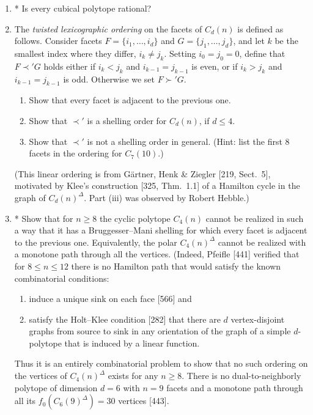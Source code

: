 \documentclass{article}
\begin{document}
\begin{enumerate}
\item* Is every cubical polytope rational?

\item The \emph{twisted lexicographic ordering} on the facets of $C_d(n)$ is defined as follows. Consider facets $F=\{i_1,\dots,i_d\}$ and $G=\{j_1,\dots,j_d\}$, and let $k$ be the smallest index where they differ, $i_k\ne j_k$. Setting $i_0=j_0=0$, define that $F\prec' G$ holds either if $i_k<j_k$ and $i_{k-1}=j_{k-1}$ is even, or if $i_k>j_k$ and $i_{k-1}=j_{k-1}$ is odd. Otherwise we set $F\succ' G$.
\begin{enumerate}[label=(\roman*)]
\item Show that every facet is adjacent to the previous one.
\item Show that $\prec'$ is a shelling order for $C_d(n)$, if $d\le 4$.
\item Show that $\prec'$ is not a shelling order in general. (Hint: list the first $8$ facets in the ordering for $C_7(10)$.)
\end{enumerate}
(This linear ordering is from G\"artner, Henk \& Ziegler [219, Sect.~5], motivated by Klee's construction [325, Thm.~1.1] of a Hamilton cycle in the graph of $C_d(n)^\Delta$. Part (iii) was observed by Robert Hebble.)

\item* Show that for $n\ge 8$ the cyclic polytope $C_4(n)$ cannot be realized in such a way that it has a Bruggesser--Mani shelling for which every facet is adjacent to the previous one. Equivalently, the polar $C_4(n)^\Delta$ cannot be realized with a monotone path through all the vertices. (Indeed, Pfeifle [441] verified that for $8\le n\le 12$ there is no Hamilton path that would satisfy the known combinatorial conditions:
\begin{enumerate}[label=(\roman*)]
\item induce a unique sink on each face [566] and
\item satisfy the Holt--Klee condition [282] that there are $d$ vertex-disjoint graphs from source to sink in any orientation of the graph of a simple $d$-polytope that is induced by a linear function.
\end{enumerate}
Thus it is an entirely combinatorial problem to show that no such ordering on the vertices of $C_4(n)^\Delta$ exists for any $n\ge 8$. There is no dual-to-neighborly polytope of dimension $d=6$ with $n=9$ facets and a monotone path through all its $f_0(C_6(9)^\Delta)=30$ vertices [443].


\end{enumerate}
\end{document}
